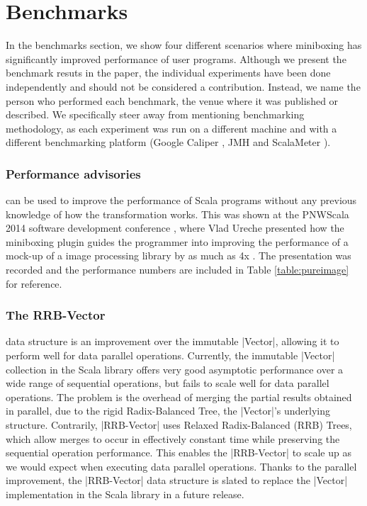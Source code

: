

\section{Benchmarks}
\label{sec:bench}

In the benchmarks section, we show four different scenarios where miniboxing has significantly improved performance of user programs. Although we present the benchmark resuts in the paper, the individual experiments have been done independently and should not be considered a contribution. Instead, we name the person who performed each benchmark, the venue where it was published or described. We specifically steer away from mentioning benchmarking methodology, as each experiment was run on a different machine and with a different benchmarking platform (Google Caliper \cite{google-caliper}, JMH \cite{jmh} and ScalaMeter \cite{scalameter}).

\subsubsection{Performance advisories} can be used to improve the performance of Scala programs without any previous knowledge of how the transformation works. This was shown at the PNWScala 2014 software development conference \cite{pnwscala-conf}, where Vlad Ureche presented how the miniboxing plugin guides the programmer into improving the performance of a mock-up of a image processing library by as much as 4x \cite{pnwscala-pureimage}. The presentation was recorded and the performance numbers are included in Table \ref{table:pureimage} for reference.

\subsubsection{The RRB-Vector} data structure \cite{rrb-vector-paper} \cite{nicolas-thesis} is an improvement over the immutable |Vector|, allowing it to perform well for data parallel operations. Currently, the immutable |Vector| collection in the Scala library offers very good asymptotic performance over a wide range of sequential operations, but fails to scale well for data parallel operations. The problem is the overhead of merging the partial results obtained in parallel, due to the rigid Radix-Balanced Tree, the |Vector|'s underlying structure. Contrarily, |RRB-Vector| uses Relaxed Radix-Balanced (RRB) Trees, which allow merges to occur in effectively constant time while preserving the sequential operation performance. This enables the |RRB-Vector| to scale up as we would expect when executing data parallel operations. Thanks to the parallel improvement, the |RRB-Vector| data structure is slated to replace the |Vector| implementation in the Scala library in a future release. 

